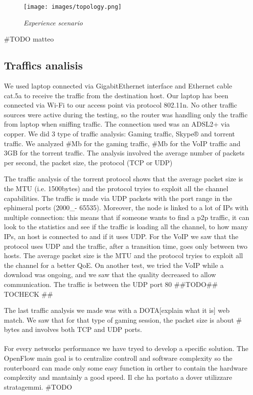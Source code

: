 \documentclass[conference,10pt]{IEEEtran}
\begin{document}
  \begin{figure}[!h]
 \centering
 \texttt{[image: images/topology.png]}
 \caption{\emph{Experience scenario}}
 \label{fig:topo}
  \end{figure}
  
  \#TODO matteo

  \subsection{Traffics analisis}\label{subsec:traf}
  We used laptop connected via
GigabitEthernet interface and Ethernet cable cat.5a to receive the traffic from the destination host.
Our laptop has been connected via Wi-Fi to our access point via protocol 802.11n.
No other traffic sources were active during the testing, so the router was handling only
the traffic from laptop when sniffing traffic. The connection used was an ADSL2+ via copper.
We did 3 type of traffic analysis: Gaming traffic, Skype® and torrent traffic. We analyzed
\#Mb for the gaming traffic, \#Mb for the VoIP traffic and 3GB for the torrent traffic.
The analysis involved the average number of packets per second, the packet size, the protocol (TCP or UDP)

The traffic analysis of the torrent protocol shows that the average packet size is the MTU
(i.e. 1500bytes) and the protocol tryies to exploit all the channel capabilities. The traffic
is made via UDP packets with the port range in the ephimeral ports (2000_- 65535).
Moreover, the node is linked to a lot of IPs with multiple connection: this means that
if someone wants to find a p2p traffic, it can look to the statistics and see if the traffic is loading all the channel,
to how many IPs, an host is connected to and if it uses UDP.
For the VoIP we saw that the protocol uses UDP and the traffic, after a transition time, goes only between two hosts.
The average packet size is the MTU and the protocol tryies to exploit all the channel for a better QoE.
On another test, we tried the VoIP while a download was ongoing, and we saw that the quality
decreased to allow communication. The traffic is between the UDP port 80 \#\#TODO\#\# TOCHECK \#\#

The last traffic analysis we made was with a DOTA[explain what it is] web match.
We saw that for that type of gaming session, the packet size is about \# bytes and involves both TCP and UDP ports.
  \\
  \\
  For every networks performance we have tryed to develop a specific solution. The OpenFlow main goal is to centralize controll and software
  complexity so the routerboard can made only some easy function in orther to contain the hardware complexity and mantainly a good speed\cite{qos_paper}.
  Il che ha portato a dover utilizzare stratagemmi.
  \#TODO %
\end{document}
